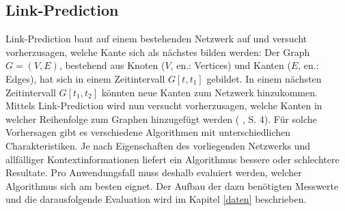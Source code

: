 \subsection{Link-Prediction}
Link-Prediction baut auf einem bestehenden Netzwerk auf und versucht vorherzusagen, welche Kante sich als nächstes bilden werden:
Der Graph $G = (V, E)$, bestehend aus Knoten ($V$, en.: Vertices) und Kanten ($E$, en.: Edges), hat sich in einem Zeitintervall $G[t, t_1]$ gebildet.
In einem nächsten Zeitintervall $G[t_1, t_2]$ könnten neue Kanten zum Netzwerk hinzukommen.
Mittels Link-Prediction wird nun versucht vorherzusagen, welche Kanten in welcher Reihenfolge zum Graphen hinzugefügt werden (\citeauthor{gao_link_2015} \citeyear{citeauthor}, S. 4).
Für solche Vorhersagen gibt es verschiedene Algorithmen mit unterschiedlichen Charakteristiken.
Je nach Eigenschaften des vorliegenden Netzwerks und allfälliger Kontextinformationen liefert ein Algorithmus bessere oder schlechtere Resultate.
Pro Anwendungsfall muss deshalb evaluiert werden, welcher Algorithmus sich am besten eignet.
Der Aufbau der dazu benötigten Messwerte und die darausfolgende Evaluation wird im Kapitel \ref{daten} beschrieben.

